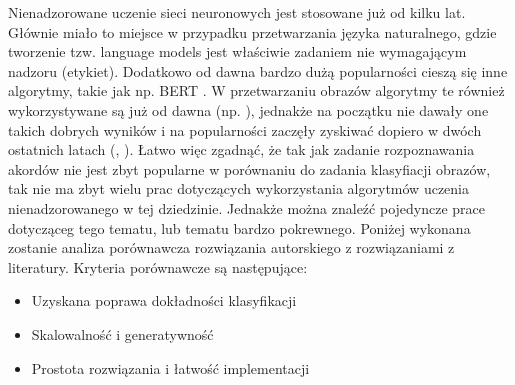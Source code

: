 Nienadzorowane uczenie sieci neuronowych jest stosowane już od kilku lat. Głównie miało to miejsce w
przypadku przetwarzania języka naturalnego, gdzie tworzenie tzw. language models jest właściwie
zadaniem nie wymagającym nadzoru (etykiet). Dodatkowo od dawna bardzo dużą popularności cieszą się
inne algorytmy, takie jak np. BERT \cite{devlin_bert_2019}. W przetwarzaniu obrazów algorytmy te
również wykorzystywane są już od dawna (np. \cite{noroozi_unsupervised_2017}), jednakże na początku
nie dawały one takich dobrych wyników i na popularności zaczęły zyskiwać dopiero w dwóch ostatnich
latach (\cite{chen_simple_2020}, \cite{xie_self-training_2020}). Łatwo więc zgadnąć, że tak jak
zadanie rozpoznawania akordów nie jest zbyt popularne w porównaniu do zadania klasyfiacji obrazów,
tak nie ma zbyt wielu prac dotyczących wykorzystania algorytmów uczenia nienadzorowanego w tej
dziedzinie. Jednakże można znaleźć pojedyncze prace dotycząceg tego tematu, lub tematu bardzo
pokrewnego. Poniżej wykonana zostanie analiza porównawcza rozwiązania autorskiego z rozwiązaniami z
literatury. Kryteria porównawcze są następujące:
\begin{itemize}
    \item Uzyskana poprawa dokładności klasyfikacji
    \item Skalowalność i generatywność
    \item Prostota rozwiązania i łatwość implementacji
\end{itemize}

